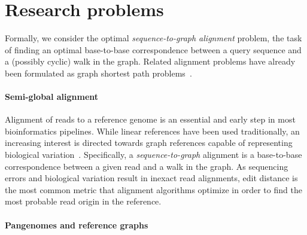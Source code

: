 \section*{Research problems}

Formally, we consider the optimal \emph{sequence-to-graph alignment} problem,
the task of finding an optimal base-to-base correspondence between a query
sequence and a (possibly cyclic) walk in the graph. Related alignment problems
have already been formulated as graph shortest path
problems~\cite{jain_complexity_2019}.


\paragraph{Semi-global alignment}

Alignment of reads to a reference genome is an essential and early step in most
bioinformatics pipelines. While linear references have been used traditionally,
an increasing interest is directed towards graph references capable of
representing biological variation~\citep{garrison_variation_2018}.
%
Specifically, a \emph{sequence-to-graph} alignment is a base-to-base
correspondence between a given read and a walk in the graph. As sequencing
errors and biological variation result in inexact read alignments, edit distance
is the most common metric that alignment algorithms optimize in order to find
the most probable read origin in the reference.



\paragraph{Pangenomes and reference graphs}


